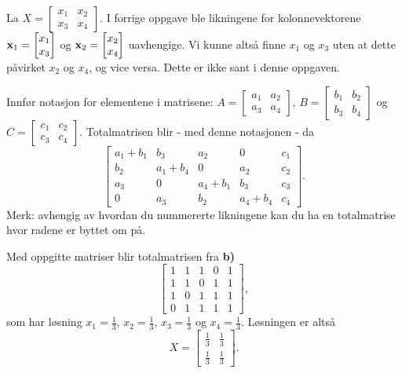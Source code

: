 \begin{losning}

\begin{punkt}
La $X=\begin{bmatrix}
x_1 & x_2\\
x_3 & x_4
\end{bmatrix}.$ I forrige oppgave ble likningene for kolonnevektorene $\mathbf{x}_1=\begin{bmatrix}
x_1\\
x_3
\end{bmatrix}$ og $\mathbf{x}_2=\begin{bmatrix}
x_2\\
x_4
\end{bmatrix}$ uavhengige. Vi kunne altså finne $x_1$ og $x_3$ uten at dette påvirket $x_2$ og $x_4$, og vice versa. Dette er ikke sant i denne oppgaven.
\end{punkt}

\begin{punkt}
Innfør notasjon for elementene i matrisene: $A=\begin{bmatrix}
a_1 & a_2\\
a_3 & a_4
\end{bmatrix}$, $B=\begin{bmatrix}
b_1 & b_2\\
b_3 & b_4
\end{bmatrix}$ og $C=\begin{bmatrix}
c_1 & c_2\\
c_3 & c_4
\end{bmatrix}$. Totalmatrisen blir - med denne notasjonen - da $$\begin{bmatrix}
a_1+b_1 & b_3 & a_2 & 0 & c_1\\
b_2 & a_1+b_4 & 0 & a_2 & c_2\\
a_3 & 0 & a_4+b_1 & b_3 & c_3\\
0 & a_3 & b_2 & a_4+b_4 & c_4
\end{bmatrix}.$$ Merk: avhengig av hvordan du nummererte likningene kan du ha en totalmatrise hvor radene er byttet om på.
\end{punkt}


\begin{punkt}
Med oppgitte matriser blir totalmatrisen fra \textbf{b)}$$\begin{bmatrix}
1 & 1 & 1 & 0 & 1\\
1 & 1 & 0 & 1 & 1\\
1 & 0 & 1 & 1 & 1\\
0 & 1 & 1 & 1 & 1
\end{bmatrix},$$ som har løsning $x_1=\frac{1}{3}$, $x_2=\frac{1}{3}$, $x_3=\frac{1}{3}$ og $x_4=\frac{1}{3}$. Løsningen er altså   
$$X=\begin{bmatrix}
\frac{1}{3} & \frac{1}{3}\\
\frac{1}{3} & \frac{1}{3}
\end{bmatrix}.$$
\end{punkt}

\end{losning}


